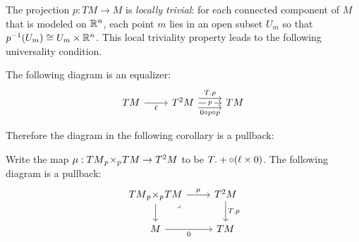 The projection $p:TM \to M$ is \emph{locally trivial}: for each connected component of $M$ that is modeled on $\mathbb{R}^n$, each point $m$ lies in an open subset $U_m$ so that $p^{-1}(U_m) \cong U_m \times \mathbb{R}^n$. 
This local triviality property leads to the following universality condition.
\begin{proposition}\label{prop:ell-universal}
    The following diagram is an equalizer:
    \[\begin{tikzcd}
        TM & {T^2M} & TM
        \arrow["p"{description}, from=1-2, to=1-3]
        \arrow["{T.p}", shift left=2, from=1-2, to=1-3]
        \arrow["{0\o p \o p}"', shift right=2, from=1-2, to=1-3]
        \arrow["\ell"', from=1-1, to=1-2]
    \end{tikzcd}\]
\end{proposition}
Therefore the diagram in the following corollary is a pullback: 
\begin{corollary}\label{cor:mu-universal}
    Write the map $\mu:TM {_{p}}\!\times_{p}\! TM \to T^2M$ to be $T.+ \circ (\ell \times 0)$. The following diagram is a pullback:
    \[\begin{tikzcd}
        {TM \ts{p}{p} TM} & {T^2M} \\
        M & TM
        \arrow["0"', from=2-1, to=2-2]
        \arrow["T.p", from=1-2, to=2-2]
        \arrow["\mu", from=1-1, to=1-2]
        \arrow[from=1-1, to=2-1]
        \arrow["\lrcorner"{anchor=center, pos=0.125}, draw=none, from=1-1, to=2-2]
    \end{tikzcd}\]
\end{corollary}

